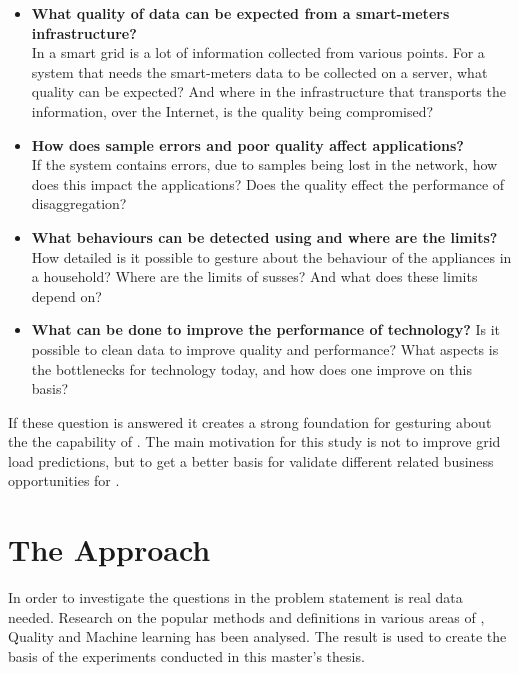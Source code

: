 \begin{itemize}
\item	\textbf{What quality of data can be expected from a smart-meters infrastructure?}\\
In a smart grid is a lot of information collected from various points. For a system that needs the smart-meters data to be collected on a server, what quality can be expected? And where in the infrastructure that transports the information, over the Internet, is the quality being compromised? 
	
	
\item	\textbf{How does sample errors and poor quality affect  applications?}\\
If the system contains errors, due to samples being lost in the network, how does this impact the  applications?  Does the quality effect the performance of  disaggregation? \\
	
\item	\textbf{What behaviours can be detected using  and where are the limits?} \\
How detailed is it possible to gesture about the behaviour of the appliances in a household? Where are the limits of susses? And what does these limits depend on?  \\
	
\item	\textbf{What can be done to improve the performance of  technology?}
Is it possible to clean data to improve quality and performance? What aspects is the bottlenecks for  technology today, and how does one improve on this basis? \\

\end{itemize}
If these question is answered it creates a strong foundation for gesturing about the the capability of . The main motivation for this study is not to improve grid load predictions, but to get a better basis for validate different  related business opportunities for . \\

\section{The Approach}
In order to investigate the questions in the problem statement is real data needed. Research on the  popular methods and definitions in various areas of , Quality and Machine learning has been analysed. The result is used to create the basis of the experiments conducted in this master's thesis. 


